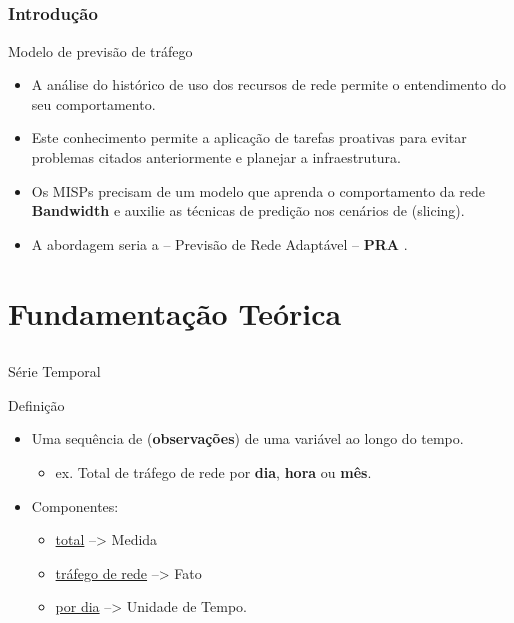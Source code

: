 \documentclass[aspectratio=169]{beamer}
\begin{document}

\subsection{}
\begin{frame}
\frametitle{Introdução}
\begin{block}{Modelo de previsão de tráfego}
    \begin{itemize}
    \item A análise do histórico de uso dos recursos de rede permite o entendimento do seu comportamento.
        \item Este conhecimento permite a aplicação de tarefas proativas para evitar problemas citados anteriormente e planejar a infraestrutura.
        \item Os MISPs precisam de um modelo que aprenda o comportamento da rede \textbf{Bandwidth} e auxilie as técnicas de predição nos cenários de (slicing).
        \item A abordagem seria a -- Previsão de Rede Adaptável -- \textbf{PRA} .
    \end{itemize}
\end{block}
\end{frame}


\section{Fundamentação Teórica}

\subsection{}
\begin{frame}{Série Temporal}
\begin{block}{Definição}

    \begin{itemize}
        \item Uma sequência de (\textbf{observações}) de uma variável ao longo do tempo.
        \begin{itemize}[triangle]
            \item ex. Total de tráfego de rede por \textbf{dia}, \textbf{hora} ou \textbf{mês}.
        \end{itemize}
        \item Componentes:
        \begin{itemize}[triangle]
            \item \underline{total} --> Medida      \item \underline {tráfego de rede} --> Fato
            \item \underline{por dia} --> Unidade de Tempo.
        \end{itemize}
        \end{itemize}
    \end{block}  
\end{frame}
\end{document}
